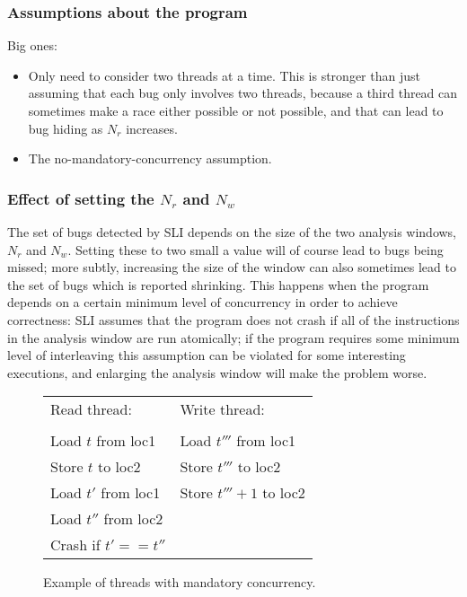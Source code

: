 \subsubsection{Assumptions about the program}

Big ones:

\begin{itemize}
\item
  Only need to consider two threads at a time.  This is stronger than
  just assuming that each bug only involves two threads, because a
  third thread can sometimes make a race either possible or not
  possible, and that can lead to bug hiding as $N_r$ increases.
\item
  The no-mandatory-concurrency assumption.
\end{itemize}

\subsubsection{Effect of setting the $N_r$ and $N_w$}
\label{sect:mandatory_concurrency}

The set of bugs detected by SLI depends on the size of the two
analysis windows, $N_r$ and $N_w$.  Setting these to two small a value
will of course lead to bugs being missed; more subtly, increasing the
size of the window can also sometimes lead to the set of bugs which is
reported shrinking.  This happens when the program depends on a
certain minimum level of concurrency in order to achieve correctness:
SLI assumes that the program does not crash if all of the instructions
in the analysis window are run atomically; if the program requires
some minimum level of interleaving this assumption can be violated for
some interesting executions, and enlarging the analysis window will
make the problem worse.

\begin{figure}
\begin{tabular}{ll}
Read thread:         & Write thread: \\
\\
Load $t$ from loc1   & Load $t'''$ from loc1 \\
Store $t$ to loc2    & Store $t'''$ to loc2 \\
Load $t'$ from loc1  & Store $t''' + 1$ to loc2 \\
Load $t''$ from loc2 & \\
Crash if $t' == t''$ & \\
\end{tabular}
\label{fig:mandatory_concurrency1}
\caption{Example of threads with mandatory concurrency.}
\end{figure}

